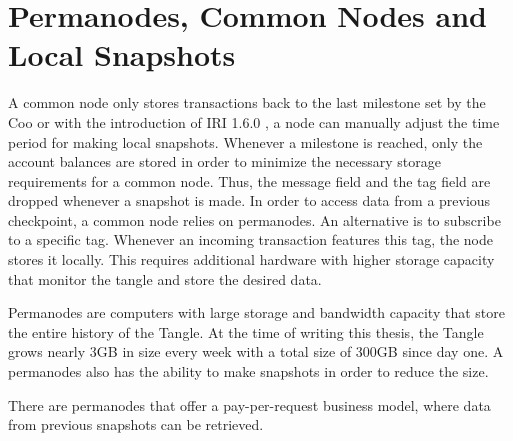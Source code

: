 \section{Permanodes, Common Nodes and Local Snapshots}\label{permanodes}

A common node only stores transactions back to the last milestone set by the Coo or with the introduction of IRI 1.6.0 \cite{local-snapshots}, a node can manually adjust the time period for making local snapshots. Whenever a milestone is reached, only the account balances are stored in order to minimize the necessary storage requirements for a common node. Thus, the message field and the tag field are dropped whenever a snapshot is made. In order to access data from a previous checkpoint, a common node relies on permanodes. An alternative is to subscribe to a specific tag. Whenever an incoming transaction features this tag, the node stores it locally. This requires additional hardware with higher storage capacity that monitor the tangle and store the desired data. 

Permanodes are computers with large storage and bandwidth capacity that store the entire history of the Tangle. At the time of writing this thesis, the Tangle grows nearly 3GB in size every week with a total size of 300GB since day one. A permanodes also has the ability to make snapshots in order to reduce the size. 

There are permanodes that offer a pay-per-request business model, where data from previous snapshots can be retrieved.